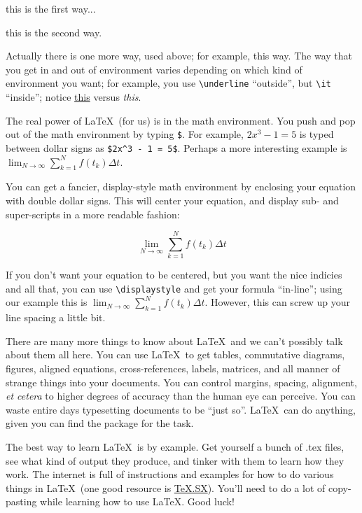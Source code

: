 \centerline{this is the first way...}

\begin{center}
	this is the second way.
\end{center}

\noindent Actually there is one more way, used above; for example, {\sc this way}.
The way that you get in and out of environment varies depending on which kind of environment you want; for example, you use \verb|\underline| ``outside'', but \verb|\it| ``inside''; notice \underline{this} versus {\it this}.

The real power of \LaTeX\ (for us) is in the math environment.
You push and pop out of the math environment by typing \verb|$|.
For example, $2x^3 - 1 = 5$ is typed between dollar signs as \verb|$2x^3 - 1 = 5$|.
Perhaps a more interesting example is $\lim_{N \to \infty} \sum_{k=1}^N f(t_k) \Delta t$.

You can get a fancier, display-style math environment by enclosing your equation with double dollar signs.
This will center your equation, and display sub- and super-scripts in a more readable fashion:

$$\lim_{N \to \infty} \sum_{k=1}^N f(t_k) \Delta t$$

If you don't want your equation to be centered, but you want the nice indicies and all that, you can use \verb|\displaystyle| and get your formula ``in-line''; using our example this is $\displaystyle \lim_{N \to \infty} \sum_{k=1}^N f(t_k) \Delta t$.
However, this can screw up your line spacing a little bit.

There are many more things to know about \LaTeX\ and we can't possibly talk about them all here.
You can use \LaTeX\ to get tables, commutative diagrams, figures, aligned equations, cross-references, labels, matrices, and all manner of strange things into your documents.
You can control margins, spacing, alignment, {\it et cetera} to higher degrees of accuracy than the human eye can perceive.
You can waste entire days typesetting documents to be ``just so''.
\LaTeX\ can do anything, given you can find the package for the task.

The best way to learn \LaTeX\ is by example.
Get yourself a bunch of .tex files, see what kind of output they produce, and tinker with them to learn how they work.
The internet is full of instructions and examples for how to do various things in \LaTeX\ (one good resource is \href{https://tex.stackexchange.com}{TeX.SX}).
You'll need to do a lot of copy-pasting while learning how to use \LaTeX.
Good luck!

